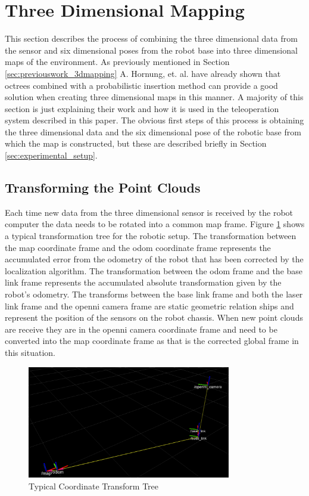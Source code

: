 \documentclass[journal]{IEEEtran}
\begin{document}
  \section{Three Dimensional Mapping}
  \label{sec:3dmapping}
  This section describes the process of combining the three dimensional data
  from the sensor and six dimensional poses from the robot base into three
  dimensional maps of the environment. As previously mentioned in Section
  \ref{sec:previouswork_3dmapping} A. Hornung, et. al. have already shown that
  octrees combined with a probabilistic insertion method can provide a good
  solution when creating three dimensional maps in this manner. A majority of
  this section is just explaining their work and how it is used in the
  teleoperation system described in this paper.\cite{octomap} The obvious
  first steps of this process is obtaining the three dimensional data and the
  six dimensional pose of the robotic base from which the map is constructed,
  but these are described briefly in Section \ref{sec:experimental_setup}.
  
  \subsection{Transforming the Point Clouds}
  Each time new data from the three dimensional sensor is received by the
  robot computer the data needs to be rotated into a common map frame. Figure
  \ref{fig:transforms} shows a typical transformation tree for the robotic
  setup. The transformation between the map coordinate frame and the odom
  coordinate frame represents the accumulated error from the odometry of the
  robot that has been corrected by the localization algorithm. The
  transformation between the odom frame and the base link frame represents the
  accumulated absolute transformation given by the robot's odometry. The
  transforms between the base link frame and both the laser link frame and the
  openni camera frame are static geometric relation ships and represent the
  position of the sensors on the robot chassis. When new point clouds are
  receive they are in the openni camera coordinate frame and need to be
  converted into the map coordinate frame as that is the corrected global
  frame in this situation.
  
  \begin{figure}[here]
    \centering
    \includegraphics[width=3.5in,keepaspectratio]{transform.pdf}
    \caption{Typical Coordinate Transform Tree}
    \label{fig:transforms}
  \end{figure}
  
\end{document}
